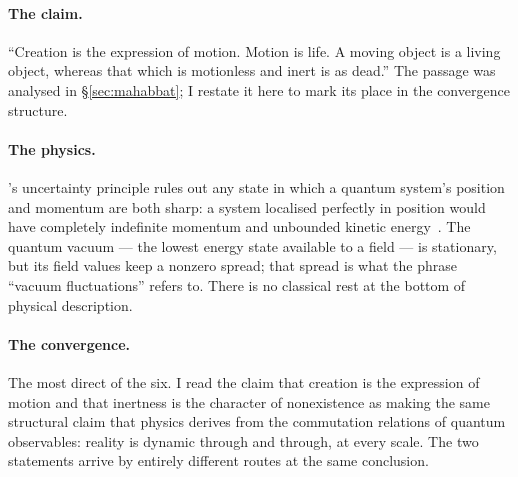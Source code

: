 \paragraph{The \bahai claim.}
``Creation is the expression of motion. Motion is life. A moving object is a
living object, whereas that which is motionless and inert is as dead.''
\citep[Talk 52]{PUP}
The passage was analysed in \S\ref{sec:mahabbat}; I restate it here to mark
its place in the convergence structure.

\paragraph{The physics.}
\citeauthor{Heisenberg1927}'s uncertainty principle rules out any state in
which a quantum system's position and momentum are both sharp: a system
localised perfectly in position would have completely indefinite momentum and
unbounded kinetic energy~\citep{Heisenberg1927}.
The quantum vacuum --- the lowest energy state available to a field --- is
stationary, but its field values keep a nonzero spread; that spread is what
the phrase ``vacuum fluctuations'' refers to.
There is no classical rest at the bottom of physical description.

\paragraph{The convergence.}
The most direct of the six.
I read the \bahai claim that creation is the expression of motion and that inertness is the
character of nonexistence as making the same structural claim that physics derives
from the commutation relations of quantum observables: reality is dynamic
through and through, at every scale.
The two statements arrive by entirely different routes at the same conclusion.
